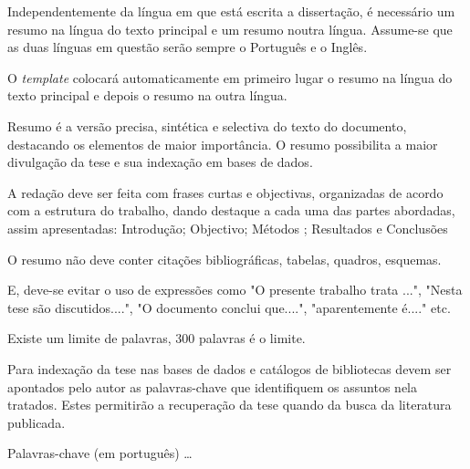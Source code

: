 \abstractPT  %

Independentemente da língua em que está escrita a dissertação, é necessário um resumo na língua do texto principal e um resumo noutra língua.  Assume-se que as duas línguas em questão serão sempre o Português e o Inglês.

O \emph{template} colocará automaticamente em primeiro lugar o resumo na língua do texto principal e depois o resumo na outra língua. 

Resumo é a versão precisa, sintética e selectiva do texto do documento, destacando os elementos de maior importância. O resumo possibilita a maior divulgação da tese e sua indexação em bases de dados.

A redação deve ser feita com frases curtas e objectivas, organizadas de acordo com a estrutura do trabalho, dando destaque a cada uma das partes abordadas, assim apresentadas: Introdução; Objectivo; Métodos ; Resultados  e Conclusões

O resumo não deve conter citações bibliográficas, tabelas, quadros, esquemas. 

E, deve-se evitar o uso de expressões como "O presente trabalho trata ...", "Nesta tese são discutidos....", "O documento conclui que....", "aparentemente é...." etc. 

Existe um limite de palavras, 300 palavras é o limite.

Para indexação da tese nas bases de dados e catálogos de bibliotecas devem ser apontados pelo autor as palavras-chave que identifiquem os assuntos nela tratados. Estes permitirão a recuperação da tese quando da busca da literatura publicada. 

\begin{keywords}
Palavras-chave (em português) \ldots
\end{keywords}
